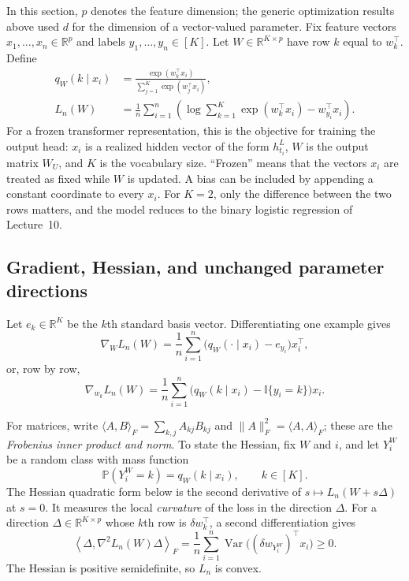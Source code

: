 \documentclass[11pt,twoside]{article}
\newcommand{\I}{\mathbb I}
\newcommand{\one}[1]{\I\{#1\}}
\renewcommand{\P}{\mathbb P}
\newcommand{\R}{\mathbb R}
\theoremstyle{definition}
\theoremstyle{remark}
\begin{document}
In this section, $p$ denotes the feature dimension; the generic optimization
results above used $d$ for the dimension of a vector-valued parameter. Fix
feature vectors $x_1,\ldots,x_n\in\R^p$ and labels
$y_1,\ldots,y_n\in[K]$. Let $W\in\R^{K\times p}$ have row $k$ equal to
$w_k^\top$. Define
\begin{align}
 q_W(k\mid x_i)
 &=\frac{\exp(w_k^\top x_i)}
         {\sum_{j=1}^K\exp(w_j^\top x_i)},
 \label{eq:softmax-probability}\\
 L_n(W)
 &=\frac1n\sum_{i=1}^n
 \left(\log\sum_{k=1}^K\exp(w_k^\top x_i)
       -w_{y_i}^\top x_i\right).
 \label{eq:softmax-loss}
\end{align}
For a frozen transformer representation, this is the objective for training
the output head: $x_i$ is a realized hidden vector of the form $h_{t_i}^L$,
$W$ is the output matrix $W_U$, and $K$ is the vocabulary size. ``Frozen''
means that the vectors $x_i$ are treated as fixed while $W$ is updated. A bias
can be included by appending a constant coordinate to every $x_i$. For $K=2$,
only the difference between the two rows matters, and the model reduces to the
binary logistic regression of Lecture~10.

\subsection{Gradient, Hessian, and unchanged parameter directions}

Let $e_k\in\R^K$ be the $k$th standard basis vector. Differentiating one
example gives
\begin{equation}
 \nabla_W L_n(W)
 =\frac1n\sum_{i=1}^n
    \bigl(q_W(\cdot\mid x_i)-e_{y_i}\bigr)x_i^\top,
 \label{eq:softmax-gradient}
\end{equation}
or, row by row,
\begin{equation}
 \nabla_{w_k}L_n(W)
 =\frac1n\sum_{i=1}^n
 \bigl(q_W(k\mid x_i)-\one{y_i=k}\bigr)x_i.
 \label{eq:softmax-row-gradient}
\end{equation}

For matrices, write
$\langle A,B\rangle_F=\sum_{k,j}A_{kj}B_{kj}$ and
$\|A\|_F^2=\langle A,A\rangle_F$; these are the \emph{Frobenius inner
product and norm}. To state the Hessian, fix $W$ and $i$, and
let $Y_i^W$ be a random class with mass function
\[
 \P(Y_i^W=k)=q_W(k\mid x_i),
 \qquad k\in[K].
\]
The Hessian quadratic form below is the second derivative of
$s\mapsto L_n(W+s\Delta)$ at $s=0$. It measures the local \emph{curvature} of
the loss in the direction $\Delta$.
For a direction $\Delta\in\R^{K\times p}$ whose $k$th row is
$\delta w_k^\top$, a second differentiation gives
\begin{equation}
 \left\langle\Delta,\nabla^2L_n(W)\Delta\right\rangle_F
 =\frac1n\sum_{i=1}^n
 \operatorname{Var}\bigl((\delta w_{Y_i^W})^\top x_i\bigr)
 \ge0.
 \label{eq:softmax-hessian-variance}
\end{equation}
The Hessian is positive semidefinite, so $L_n$ is convex.
\end{document}
